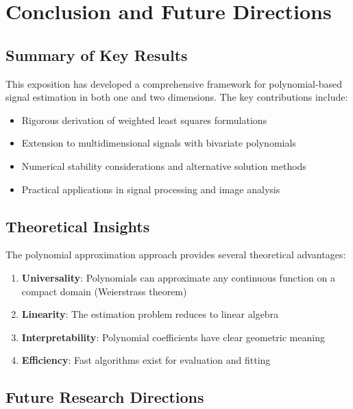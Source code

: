\documentclass[12pt]{article}
\begin{document}
\section{Conclusion and Future Directions}

\subsection{Summary of Key Results}

This exposition has developed a comprehensive framework for polynomial-based signal estimation in both one and two dimensions. The key contributions include:

\begin{itemize}
    \item Rigorous derivation of weighted least squares formulations
    \item Extension to multidimensional signals with bivariate polynomials
    \item Numerical stability considerations and alternative solution methods
    \item Practical applications in signal processing and image analysis
\end{itemize}

\subsection{Theoretical Insights}

The polynomial approximation approach provides several theoretical advantages:

\begin{enumerate}
    \item \textbf{Universality}: Polynomials can approximate any continuous function on a compact domain (Weierstrass theorem)
    \item \textbf{Linearity}: The estimation problem reduces to linear algebra
    \item \textbf{Interpretability}: Polynomial coefficients have clear geometric meaning
    \item \textbf{Efficiency}: Fast algorithms exist for evaluation and fitting
\end{enumerate}

\subsection{Future Research Directions}
\end{document}
